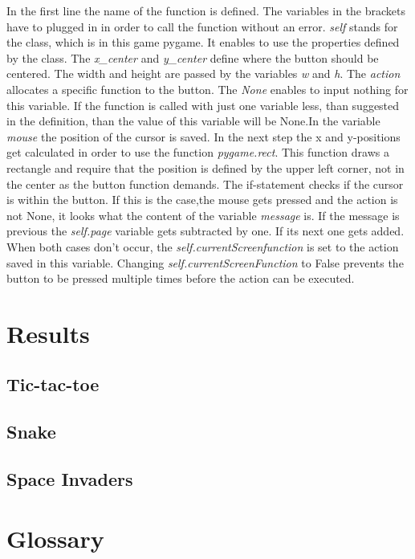 \documentclass[12pt]{article}
\begin{document}
In the first line the name of the function is defined. The variables in the brackets have to plugged in in order to call the function without an error.  \textit{self} stands for the class, which is in this game pygame. It enables to use the properties defined by the class. The \textit{x\_center} and  \textit{y\_center} define where the button should be centered. The width and height are passed by the variables \textit{w} and  \textit{h}. The  \textit{action} allocates a specific function to the button. The \textit{None} enables to input nothing for this variable. If the function is called with just one variable less, than suggested in the definition, than the value of this variable will be None.In the variable \textit{mouse} the position of the cursor is saved. In the next step the x and y-positions get calculated in order to use the function \textit{pygame.rect}. This function draws a rectangle and require that the position is defined by the upper left corner, not in the center as the button function demands. The if-statement checks if the cursor is within the button. If this is the case,the mouse gets pressed and the action is not None, it looks what the content of the variable \textit{message} is. If the message is previous the \textit{self.page} variable gets subtracted by one. If its next one gets added. When both cases don't occur, the \textit{self.currentScreenfunction} is set to the action saved in this variable. Changing \textit{self.currentScreenFunction} to False prevents the button to be pressed multiple times before the action can be executed.

\section{Results}
\subsection{Tic-tac-toe}
\subsection{Snake}
\subsection{Space Invaders}
\section{Glossary}


\newpage

\listoffigures
\end{document}
